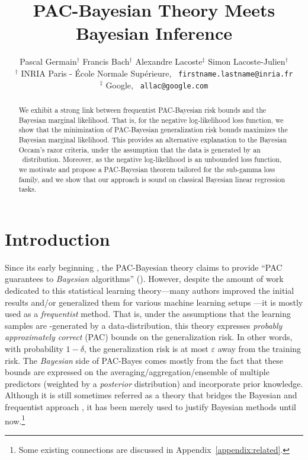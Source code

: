 \documentclass{article}
\title{PAC-Bayesian Theory Meets Bayesian Inference}
\author{
	Pascal Germain$^\dagger$ \quad Francis Bach$^\dagger$  \quad Alexandre Lacoste$^\ddagger$ \quad Simon Lacoste-Julien$^\dagger$\\
	$^\dagger$ INRIA Paris - \'Ecole Normale Sup\'erieure, \ \texttt{firstname.lastname@inria.fr}\\
		$^\ddagger$ Google, \ \texttt{allac@google.com}
}
\theoremstyle{definition}
\theoremstyle{plain}
\begin{document}
%

\maketitle

\begin{abstract}
We exhibit a strong link between frequentist PAC-Bayesian risk bounds and the Bayesian marginal likelihood.
That is, for the negative log-likelihood loss function, we show that the minimization of PAC-Bayesian generalization risk bounds maximizes the Bayesian marginal likelihood.
This provides an alternative explanation to the Bayesian Occam's razor criteria, under the assumption that the data is generated by an \iid~distribution. 
Moreover, as the negative log-likelihood is an unbounded loss function, we motivate and propose a PAC-Bayesian theorem tailored for the sub-gamma loss family, and we show that our approach is sound on classical Bayesian linear regression tasks. 
%
\end{abstract}

\section{Introduction}

Since its early beginning \citep{mcallester-99, shawetaylor-97}, the PAC-Bayesian theory claims to provide ``PAC guarantees to \emph{Bayesian} algorithms'' (\citet{mcallester-99}).
However, despite the amount of work dedicated to this statistical learning theory---many authors improved the initial results
\citep{catoni-07,lever-13,mcallester-03a,seeger-thesis,tolstikhin-13}
%
%
and/or generalized them for various machine learning setups
\citep{graal-aistats14,graal-icml16-dalc,grunwald&mehta-16,langford-02,pentina-14,seldin-10,seldin-11,seldin-12}%
%
---it is 
%
mostly used as a \emph{frequentist} method. That is, under the assumptions that the learning samples are \iid-generated by a data-distribution, this theory expresses \emph{probably approximately correct} (PAC) bounds on the generalization risk. In other words, with probability $1{-}\delta$, the generalization risk is at most $\varepsilon$ away from the training risk.  The \emph{Bayesian} side of PAC-Bayes comes mostly from the fact that these bounds are expressed on the averaging/aggregation/ensemble of multiple predictors (weighted by a \emph{posterior} distribution) and  incorporate prior knowledge.  Although it is still sometimes referred as a theory that bridges the Bayesian and frequentist approach 
\cite[\eg,][]{guyon-10},
%
 it has been merely used to  justify Bayesian methods until now.\footnote{Some existing connections \citep{banerjee-06,bissiri-16,grunwald-2012,lacoste-thesis,seeger-02,seeger-thesis,zhang-06} are discussed in Appendix~\ref{appendix:related}.}
%
%
\end{document}
